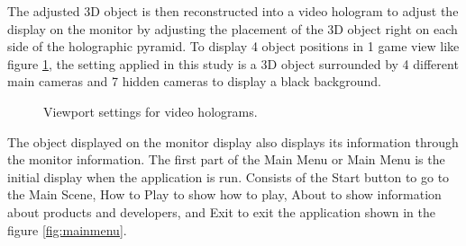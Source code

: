 \documentclass[conference]{IEEEtran}
\begin{document}
		The adjusted 3D object is then reconstructed into a video hologram to adjust the display on the monitor by adjusting the placement of the 3D object right on each side of the holographic pyramid. To display 4 object positions in 1 game view like figure \ref{fig:unity_12cam}, the setting applied in this study is a 3D object surrounded by 4 different main cameras and 7 hidden cameras to display a black background.
		\vspace{-2ex}
		\begin{figure}[h]
			\vspace{-1ex}
			\caption{Viewport settings for video holograms.}
			\label{fig:unity_12cam}
		\end{figure}
		\vspace{-2ex}
		
		The object displayed on the monitor display also displays its information through the monitor information. The first part of the Main Menu or Main Menu is the initial display when the application is run. Consists of the Start button to go to the Main Scene, How to Play to show how to play, About to show information about products and developers, and Exit to exit the application shown in the figure \ref{fig:mainmenu}.
		
\end{document}

